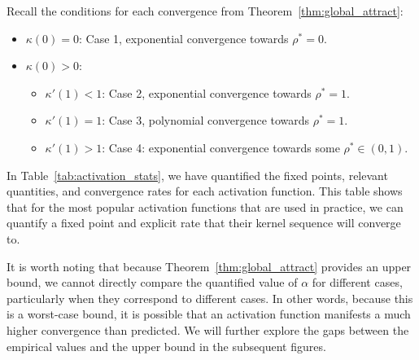 \documentclass[twoside]{article}
\theoremstyle{definition}
\begin{document}
Recall the conditions for each convergence from Theorem~\ref{thm:global_attract}:
\begin{itemize}
    \item $\kappa(0)=0$: Case 1, exponential convergence towards $\rho^*=0.$
    \item $\kappa(0)>0$:
    \begin{itemize}
        \item $\kappa'(1)<1$: Case 2, exponential convergence towards $\rho^*=1.$
        \item $\kappa'(1)=1$: Case 3, polynomial convergence towards $\rho^*=1.$
        \item $\kappa'(1)>1$: Case 4: exponential convergence towards some $\rho^*\in (0,1).$
    \end{itemize}
\end{itemize}
In Table~\ref{tab:activation_stats}, we have quantified the fixed points, relevant quantities, and convergence rates for each activation function. This table shows that for the most popular activation functions that are used in practice, we can quantify a fixed point and explicit rate that their kernel sequence will converge to. 

It is worth noting that because Theorem~\ref{thm:global_attract} provides an upper bound, we cannot directly compare the quantified value of $\alpha$ for different cases, particularly when they correspond to different cases. In other words, because this is a worst-case bound, it is possible that an activation function manifests a much higher convergence than predicted. We will further explore the gaps between the empirical values and the upper bound in the subsequent figures. 
\end{document}
